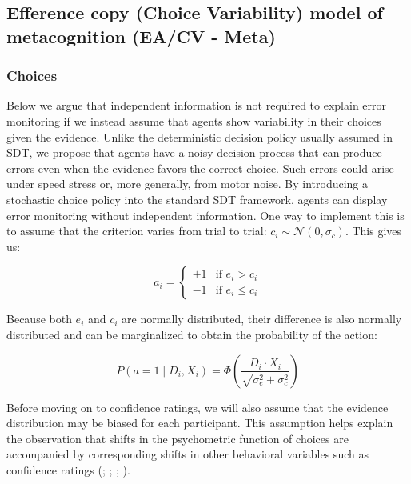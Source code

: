 \documentclass[
]{article}
\begin{document}
\subsection{Efference copy (Choice Variability) model of metacognition
(EA/CV -
Meta)}\label{efference-copy-choice-variability-model-of-metacognition-eacv---meta}

\subsubsection{Choices}\label{choices}

Below we argue that independent information is not required to explain
error monitoring if we instead assume that agents show variability in
their choices given the evidence. Unlike the deterministic decision
policy usually assumed in SDT, we propose that agents have a noisy
decision process that can produce errors even when the evidence favors
the correct choice. Such errors could arise under speed stress or, more
generally, from motor noise. By introducing a stochastic choice policy
into the standard SDT framework, agents can display error monitoring
without independent information. One way to implement this is to assume
that the criterion varies from trial to trial:
\(c_i \sim \mathcal{N}(0,\sigma_c)\). This gives us:

\[
a_i = \begin{cases}+1 & \text{if } e_i > c_i \\ -1 & \text{if } e_i \le c_i\end{cases}
\]

Because both \(e_i\) and \(c_i\) are normally distributed, their
difference is also normally distributed and can be marginalized to
obtain the probability of the action:

\[
P(a = 1 \mid D_i, X_i) = \Phi\left(\frac{D_i \cdot X_i}{\sqrt{\sigma_e^2 + \sigma_c^2}}\right)
\]

Before moving on to confidence ratings, we will also assume that the
evidence distribution may be biased for each participant. This
assumption helps explain the observation that shifts in the psychometric
function of choices are accompanied by corresponding shifts in other
behavioral variables such as confidence ratings
(;
;
;
).
\end{document}
